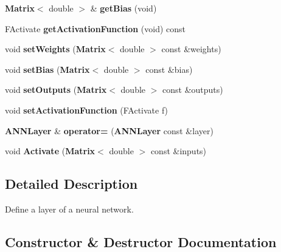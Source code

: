 \begin{DoxyCompactItemize}
\item 
{\bf Matrix}$<$ double $>$ \& {\bfseries get\+Bias} (void)\label{class_g_a_n_n_1_1_a_n_n_layer_a2814de885892bd51d23d157fb7ff53a9}

\item 
F\+Activate {\bfseries get\+Activation\+Function} (void) const \label{class_g_a_n_n_1_1_a_n_n_layer_a17a2ecad13a3aac38329470e8575ed62}

\item 
void {\bfseries set\+Weights} ({\bf Matrix}$<$ double $>$ const \&weights)\label{class_g_a_n_n_1_1_a_n_n_layer_a99b44245e660160e6431f4bd8b7cf8ed}

\item 
void {\bfseries set\+Bias} ({\bf Matrix}$<$ double $>$ const \&bias)\label{class_g_a_n_n_1_1_a_n_n_layer_a33b17fa33318cc5ab3060025ccf90faf}

\item 
void {\bfseries set\+Outputs} ({\bf Matrix}$<$ double $>$ const \&outputs)\label{class_g_a_n_n_1_1_a_n_n_layer_a7249be13922695f54aa3ed0b888584b8}

\item 
void {\bfseries set\+Activation\+Function} (F\+Activate f)\label{class_g_a_n_n_1_1_a_n_n_layer_afee60047b0ccb6d2b92f75d4b55febdc}

\item 
{\bf A\+N\+N\+Layer} \& {\bfseries operator=} ({\bf A\+N\+N\+Layer} const \&layer)\label{class_g_a_n_n_1_1_a_n_n_layer_a2b22cd2b08de3d0b41615dd6be0198d4}

\item 
void {\bfseries Activate} ({\bf Matrix}$<$ double $>$ const \&inputs)\label{class_g_a_n_n_1_1_a_n_n_layer_aa8388e643e0916ad8366bb8abc227331}

\end{DoxyCompactItemize}


\subsection{Detailed Description}
Define a layer of a neural network. 

\subsection{Constructor \& Destructor Documentation}

